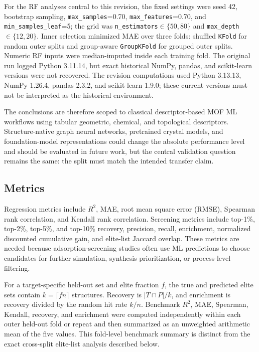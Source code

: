 \documentclass[11pt,a4paper]{article}
\begin{document}
For the RF analyses central to this revision, the fixed settings were seed 42, bootstrap sampling, \texttt{max\_samples}=0.70, \texttt{max\_features}=0.70, and \texttt{min\_samples\_leaf}=5; the grid was \texttt{n\_estimators}$\in\{50,80\}$ and \texttt{max\_depth}$\in\{12,20\}$. Inner selection minimized MAE over three folds: shuffled \texttt{KFold} for random outer splits and group-aware \texttt{GroupKFold} for grouped outer splits. Numeric RF inputs were median-imputed inside each training fold. The original run logged Python 3.11.14, but exact historical NumPy, pandas, and scikit-learn versions were not recovered. The revision computations used Python 3.13.13, NumPy 1.26.4, pandas 2.3.2, and scikit-learn 1.9.0; these current versions must not be interpreted as the historical environment.

The conclusions are therefore scoped to classical descriptor-based MOF ML workflows using tabular geometric, chemical, and topological descriptors. Structure-native graph neural networks, pretrained crystal models, and foundation-model representations could change the absolute performance level and should be evaluated in future work, but the central validation question remains the same: the split must match the intended transfer claim.


\subsection*{Metrics}
Regression metrics include $R^2$, MAE, root mean square error (RMSE), Spearman rank correlation, and Kendall rank correlation. Screening metrics include top-1\%, top-2\%, top-5\%, and top-10\% recovery, precision, recall, enrichment, normalized discounted cumulative gain, and elite-list Jaccard overlap. These metrics are needed because adsorption-screening studies often use ML predictions to choose candidates for further simulation, synthesis prioritization, or process-level filtering.

For a target-specific held-out set and elite fraction $f$, the true and predicted elite sets contain $k=\lceil fn\rceil$ structures. Recovery is $|T\cap P|/k$, and enrichment is recovery divided by the random hit rate $k/n$. Benchmark $R^2$, MAE, Spearman, Kendall, recovery, and enrichment were computed independently within each outer held-out fold or repeat and then summarized as an unweighted arithmetic mean of the five values. This fold-level benchmark summary is distinct from the exact cross-split elite-list analysis described below.
\end{document}
